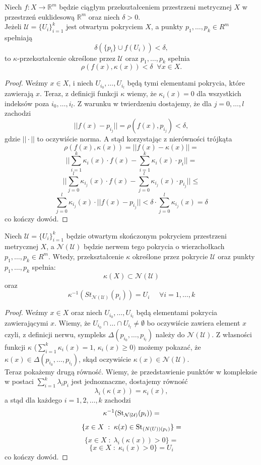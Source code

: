 \begin{twie} %
    Niech $f:X\rightarrow \mathbb{R}^m$ będzie ciągłym przekształceniem przestrzeni metrycznej $X$ w przestrzeń euklidesową $\mathbb{R}^m$ oraz niech $\delta>0$. \\
    Jeżeli $\mathcal{U} = \{U_i\}_{i=1}^k$ jest otwartym pokryciem $X$, a punkty $p_1, \ldots ,p_k \in R^m$ spełniają
    \[\delta(\{p_i\}\cup f(U_i))<\delta,\]
    to $\kappa$-przekształcenie określone przez $\mathcal{U}$ oraz $p_1, \ldots, p_k$ spełnia 
    \[\rho(f(x), \kappa(x))<\delta\;\;\forall x\in X.\]
\end{twie}
\begin{proof}
    Weźmy $x\in X$, i niech $U_{i_0}, \ldots, U_{i_l}$ będą tymi elementami pokrycia, które zawierają $x$. Teraz, z definicji funkcji $\kappa$ wiemy, że 
    $\kappa_i(x) = 0$ dla wszystkich indeksów poza $i_0, \ldots, i_l$. Z warunku w twierdzeniu dostajemy, że dla $j=0, \ldots, l$ zachodzi
    \[||f(x) - p_{i_j}|| = \rho(f(x), p_{i_j})< \delta,\]
    gdzie $||\cdot ||$ to oczywiście norma. A stąd korzystając z nierówności trójkąta
    \[\rho(f(x), \kappa(x)) = ||f(x) - \kappa(x)|| = \]
    \[||\sum_{i=1}^k \kappa_i(x)\cdot f(x) - \sum_{i=1}^k \kappa_i(x)\cdot p_{i}|| =\]
    \[||\sum_{j=0}^l \kappa_{i_j}(x)\cdot f(x) - \sum_{j=0}^l \kappa_{i_j}(x)\cdot p_{i_j}|| \le\]
    \[\sum_{j=0}^l \kappa_{i_j}(x) \cdot ||f(x)-p_{i_j}||< \delta\cdot\sum_{j=0}^l \kappa_{i_j}(x) = \delta\]
    co kończy dowód.
\end{proof}

\begin{twie} %
    \label{twie:1_10_7}
    Niech $\mathcal{U} = \{U_i\}_{i=1}^k$ będzie otwartym skończonym pokryciem przestrzeni metrycznej $X$, a $\mathcal{N(U)}$ będzie nerwem tego pokrycia o wierzchołkach $p_1, \ldots, p_k\in R^m$. 
    Wtedy, przekształcenie $\kappa$ określone przez pokrycie $\mathcal{U}$ oraz punkty $p_1, \ldots, p_k$ spełnia:
    \[\kappa(X) \subset \mathcal{N(U)}\]
    oraz
    \[\kappa ^{-1}(St_{\mathcal{N(U)}}(p_i))=U_i\;\;\;\;\ \forall i =1, \ldots, k\] 
\end{twie}
\begin{proof}
    Weźmy $x\in X$ oraz niech $U_{i_0}, \ldots, U_{i_l}$ będą elementami pokrycia zawierającymi $x$. Wiemy, że $U_{i_0}\cap  \ldots\cap U_{i_l} \ne \emptyset$ bo oczywiście zawiera element $x$ czyli, z definicji nerwu, sympleks $\Delta (p_{i_0}, \ldots, p_{i_l})$ należy do $\mathcal{N(U)}$. Z własności funkcji $\kappa$ ($\sum _{i=1}^k\kappa_i(x)=1$, $\kappa_i(x)\ge 0) $ możemy pokazać, że $\kappa(x)\in \Delta(p_{i_0}, \ldots, p_{i_l})$, skąd oczywiście $\kappa(x)\in \mathcal{N(U)}$.\\

    Teraz pokażemy drugą równość. Wiemy, że przedstawienie punktów w kompleksie w postaci $\sum_{i=1}^k \lambda_i p_i$ jest jednoznaczne, dostajemy równość
    \[
    \lambda_i (\kappa(x))=\kappa_i(x),
    \]
    a stąd dla każdego $i=1,2,\ldots,k$ zachodzi
    \[ \kappa^{-1}(\operatorname{St} _{\mathcal{N(U)}}(p_i))= \]
    \[ \{x\in X \;:\; \kappa(x)\in \operatorname{St} _{\mathcal(N(U))(p_i)}\}= \]
    \[\{x\in X \;:\; \lambda_i(\kappa(x))>0\}=\]
    \[\{ x\in X \;:\; \kappa_i(x)>0 \} = U_i\]
    co kończy dowód.
\end{proof}

